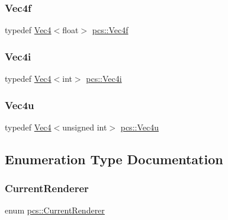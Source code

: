 \mbox{\label{namespacepcs_a826b4146f438aa3a4c6a5c157bc8dea2}} 
\subsubsection{\texorpdfstring{Vec4f}{Vec4f}}
{\footnotesize\ttfamily typedef \hyperlink{structpcs_1_1Vec4}{Vec4}$<$float$>$ \hyperlink{namespacepcs_a826b4146f438aa3a4c6a5c157bc8dea2}{pcs\+::\+Vec4f}}

\mbox{\label{namespacepcs_acc781a5c34ea403d128e3e500c74d9ad}} 
\subsubsection{\texorpdfstring{Vec4i}{Vec4i}}
{\footnotesize\ttfamily typedef \hyperlink{structpcs_1_1Vec4}{Vec4}$<$int$>$ \hyperlink{namespacepcs_acc781a5c34ea403d128e3e500c74d9ad}{pcs\+::\+Vec4i}}

\mbox{\label{namespacepcs_a4adb2d4806269c0560cf9dee9a4bbf86}} 
\subsubsection{\texorpdfstring{Vec4u}{Vec4u}}
{\footnotesize\ttfamily typedef \hyperlink{structpcs_1_1Vec4}{Vec4}$<$unsigned int$>$ \hyperlink{namespacepcs_a4adb2d4806269c0560cf9dee9a4bbf86}{pcs\+::\+Vec4u}}



\subsection{Enumeration Type Documentation}
\mbox{\label{namespacepcs_ad2936e1e1cc9e4a344e2e90394d38ea2}} 
\subsubsection{\texorpdfstring{Current\+Renderer}{CurrentRenderer}}
{\footnotesize\ttfamily enum \hyperlink{namespacepcs_ad2936e1e1cc9e4a344e2e90394d38ea2}{pcs\+::\+Current\+Renderer}\hspace{0.3cm}{\ttfamily [strong]}}



